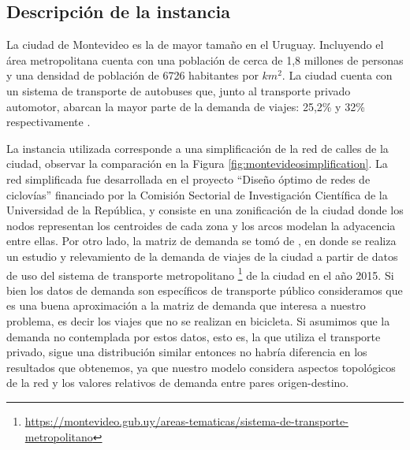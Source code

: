 \subsection{Descripción de la instancia}

La ciudad de Montevideo es la de mayor tamaño en el Uruguay. Incluyendo el área metropolitana cuenta con una población de cerca de 1,8 millones de personas y una densidad de población de 6726 habitantes por $km^2$. La ciudad cuenta con un sistema de transporte de autobuses que, junto al transporte privado automotor, abarcan la mayor parte de la demanda de viajes: 25,2\% y 32\% respectivamente \parencite{Mauttone2017a}.

La instancia utilizada corresponde a una simplificación de la red de calles de la ciudad, observar la comparación en la Figura \ref{fig:montevideosimplification}. La red simplificada fue desarrollada en el proyecto ``Diseño óptimo de redes de ciclovías'' financiado por la Comisión Sectorial de Investigación Científica de la Universidad de la República, y consiste en una zonificación de la ciudad donde los nodos representan los centroides de cada zona y los arcos modelan la adyacencia entre ellas. Por otro lado, la matriz de demanda se tomó de \textcite{Massobrio2020}, en donde se realiza un estudio y relevamiento de la demanda de viajes de la ciudad a partir de datos de uso del sistema de transporte metropolitano \footnote{\url{https://montevideo.gub.uy/areas-tematicas/sistema-de-transporte-metropolitano}} de la ciudad en el año 2015. Si bien los datos de demanda son específicos de transporte público consideramos que es una buena aproximación a la matriz de demanda que interesa a nuestro problema, es decir los viajes que no se realizan en bicicleta. Si asumimos que la demanda no contemplada por estos datos, esto es, la que utiliza el transporte privado, sigue una distribución similar entonces no habría diferencia en los resultados que obtenemos, ya que nuestro modelo considera aspectos topológicos de la red y los valores relativos de demanda entre pares origen-destino.


